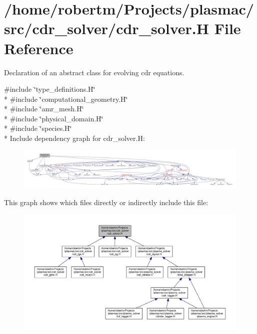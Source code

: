 \hypertarget{cdr__solver_8H}{}\section{/home/robertm/\+Projects/plasmac/src/cdr\+\_\+solver/cdr\+\_\+solver.H File Reference}
\label{cdr__solver_8H}


Declaration of an abstract class for evolving cdr equations.  


{\ttfamily \#include \char`\"{}type\+\_\+definitions.\+H\char`\"{}}\\*
{\ttfamily \#include \char`\"{}computational\+\_\+geometry.\+H\char`\"{}}\\*
{\ttfamily \#include \char`\"{}amr\+\_\+mesh.\+H\char`\"{}}\\*
{\ttfamily \#include \char`\"{}physical\+\_\+domain.\+H\char`\"{}}\\*
{\ttfamily \#include \char`\"{}species.\+H\char`\"{}}\\*
Include dependency graph for cdr\+\_\+solver.\+H\+:\nopagebreak
\begin{figure}[H]
\begin{center}
\leavevmode
\includegraphics[width=350pt]{cdr__solver_8H__incl}
\end{center}
\end{figure}
This graph shows which files directly or indirectly include this file\+:\nopagebreak
\begin{figure}[H]
\begin{center}
\leavevmode
\includegraphics[width=350pt]{cdr__solver_8H__dep__incl}
\end{center}
\end{figure}
